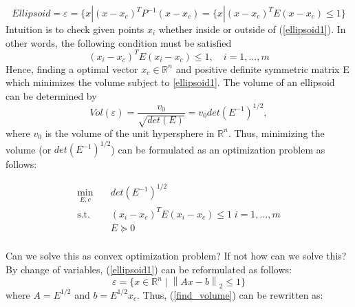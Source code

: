 \documentclass[12pt]{article}%
\begin{document}

\begin{equation}\label{ellipsoid1}
    Ellipsoid = \varepsilon  = \{x | (x-x_c)^TP^{-1}(x-x_c) = \{x | (x-x_c)^TE(x-x_c)  \leq 1\}
\end{equation}
Intuition is to check given points $x_i$ whether inside or outside of (\ref{ellipsoid1}). In other words, the following condition must be satisfied
\begin{equation}\label{ellipsoid1}
   (x_i-x_c)^TE(x_i-x_c) \leq 1, \quad i=1,...,m
\end{equation} Hence, finding a optimal vector $x_c\in \mathbb{R}^n$ and positive definite symmetric matrix E which minimizes the volume subject to \ref{ellipsoid1}. The volume of an ellipsoid can be determined by\cite{Moshtagh_minimumvolume} 
\begin{equation}
     Vol(\varepsilon) = \frac{v_0}{\sqrt{det(E)}} = v_0 det(E^{-1})^{1/2},
\end{equation} where $v_0$ is the volume of the unit hypersphere in $\mathbb{R}^{n}$. Thus, minimizing the volume (or $det(E^{-1})^{1/2}$) can be formulated as an optimization problem as follows:

\begin{equation}\label{find_volume}
\begin{aligned}
\min_{E,c} \quad & det(E^{-1})^{1/2}\\
\textrm{s.t.} \quad & (x_i -x_c)^TE(x_i-x_c) \leq 1 \; i=1,...,m\\
  & E \succeq 0\\
\end{aligned}
\end{equation}

Can we solve this as convex optimization problem? If not how can we solve this? By change of variables, (\ref{ellipsoid1}) can be reformulated as follows:
\begin{equation}
    \varepsilon = \{ x \in \mathbb{R}^n \; | \; \left \| Ax-b \right \|_2 \leq 1\}
\end{equation} where $A = E^{1/2}$ and $b = E^{1/2}x_c$. Thus, (\ref{find_volume}) can be rewritten as:
\end{document}
